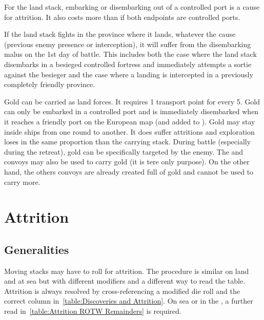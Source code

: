 For the land stack, embarking or disembarking out of a controlled port is a
cause for attrition. It also costs more \MP than if both endpoints are
controlled ports.

If the land stack fights in the province where it lands, whatever the cause
(previous enemy presence or interception), it will suffer from the
disembarking malus on the 1st day of battle. This includes both the case where
the land stack disembarks in a besieged controlled fortress and immediately
attempts a sortie against the besieger and the case where a landing is
intercepted in a previously completely friendly province.

Gold can be carried as land forces. It requires 1 transport point for every
5\ducats. Gold can only be embarked in a controlled port and is immediately
disembarked when it reaches a friendly port on the European map (and added to
). Gold may stay inside ships from
one round to another. It does suffer attritions and exploration loses in the
same proportion than the carrying stack. During battle (especially during the
retreat), gold can be specifically targeted by the enemy. The  and  convoys may also be used to carry gold (it
is tere only purpose). On the other hand, the others convoys are already
created full of gold and cannot be used to carry more.



\section{Attrition}
\label{chMilitary:Attrition}
\subsection{Generalities}
Moving stacks may have to roll for attrition. The procedure is similar on land
and at sea but with different modifiers and a different way to read the
table. Attrition is always resolved by cross-referencing a modified die roll
and the correct column in~\ref{table:Discoveries and Attrition}. On sea or in
the \ROTW, a further read in~\ref{table:Attrition ROTW Remainders} is
required.

